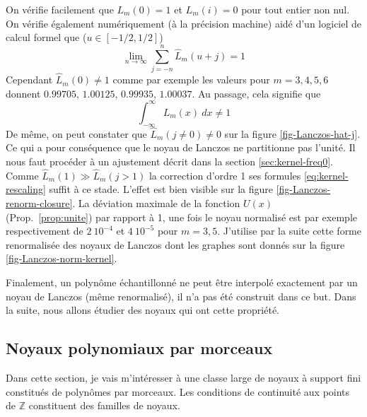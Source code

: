 \documentclass[11pt,twoside]{article}
\begin{document}
On vérifie facilement que $L_m(0)=1$ et $L_m(i)=0$ pour tout entier non nul. On vérifie également numériquement (à la précision machine) aidé d'un logiciel de calcul formel que ($u\in[-1/2,1/2]$)
\begin{equation}
\lim_{n\rightarrow \infty} \sum_{j=-n}^n \hat{L}_m(u+j)=1
\end{equation}
Cependant $\hat{L}_m(0)\neq 1$ comme par exemple les valeurs pour $m=3,4,5,6$ donnent $0.99705$, $1.00125$, $0.99935$, $1.00037$. Au passage, cela signifie que 
\begin{equation}
\int_{-\infty}^\infty L_m(x)\ dx \neq 1
\end{equation}
De même, on peut constater que $\hat{L}_m(j\neq0)\neq 0$ sur la figure \ref{fig-Lanczos-hat-j}. Ce qui a pour conséquence que le noyau de Lanczos ne partitionne pas l'unité. Il nous faut procéder à un ajustement décrit dans la section \ref{sec:kernel-freq0}. Comme $\hat{L}_m(1)\gg \hat{L}_m(j>1)$ la correction d'ordre 1 ses formules \ref{eq:kernel-rescaling} suffit à ce stade. L'effet est bien visible sur la figure \ref{fig-Lanczos-renorm-closure}. La déviation maximale de la fonction $U(x)$ (Prop.~\ref{prop:unite})  par rapport à 1, une fois le noyau normalisé est par exemple respectivement de $2\ 10^{-4}$ et $4\ 10^{-5}$ pour $m=3,5$. J'utilise par la suite cette forme renormalisée des noyaux de Lanczos dont les graphes sont donnés sur la figure \ref{fig-Lanczos-norm-kernel}. 

Finalement, un polynôme échantillonné ne peut être interpolé exactement par un noyau de Lanczos (même renormalisé), il n'a pas été construit dans ce but. Dans la suite, nous allons étudier des noyaux  qui ont cette propriété.
%
\subsection{Noyaux polynomiaux par morceaux}
%
Dans cette section, je vais m'intéresser à une classe large de noyaux à support fini constitués de polynômes par morceaux. Les conditions de continuité aux points de $\mathbb{Z}$ constituent des familles de noyaux. 
%
\end{document}
